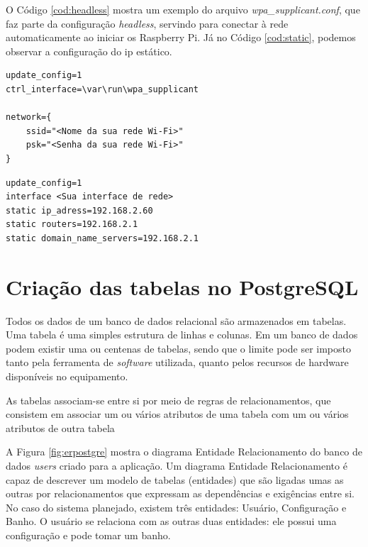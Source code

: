 O Código \ref{cod:headless} mostra um exemplo do arquivo \textit{wpa\_supplicant.conf}, que faz parte da configuração \textit{headless}, servindo para conectar à rede automaticamente ao iniciar os Raspberry Pi. Já no Código \ref{cod:static}, podemos observar a configuração do ip estático.

\begin{lstlisting}[caption=Exemplo de configuração \textit{headless}, label=cod:headless]
update_config=1
ctrl_interface=\var\run\wpa_supplicant

network={
    ssid="<Nome da sua rede Wi-Fi>"
    psk="<Senha da sua rede Wi-Fi>"
}
\end{lstlisting}

\newpage

\begin{lstlisting}[caption=Exemplo de configuração do IP estático, label=cod:static]
update_config=1
interface <Sua interface de rede>
static ip_adress=192.168.2.60
static routers=192.168.2.1
static domain_name_servers=192.168.2.1
\end{lstlisting}



\section{Criação das tabelas no PostgreSQL}

Todos os dados de um banco de dados relacional são armazenados em tabelas. Uma tabela é uma simples estrutura de linhas e colunas. Em um banco de dados podem existir uma ou centenas de tabelas, sendo que o limite pode ser imposto tanto pela ferramenta de \textit{software} utilizada, quanto pelos recursos de hardware disponíveis no equipamento.

As tabelas associam-se entre si por meio de regras de relacionamentos, que consistem em associar um ou vários atributos de uma tabela com um ou vários atributos de outra tabela

A Figura \ref{fig:erpostgre} mostra o diagrama Entidade Relacionamento do banco de dados \textit{users} criado para a aplicação. Um diagrama Entidade Relacionamento é capaz de descrever um modelo de tabelas (entidades) que são ligadas umas as outras por relacionamentos que expressam as dependências e exigências entre si. No caso do sistema planejado, existem três entidades: Usuário, Configuração e Banho. O usuário se relaciona com as outras duas entidades: ele possui uma configuração e pode tomar um banho.

